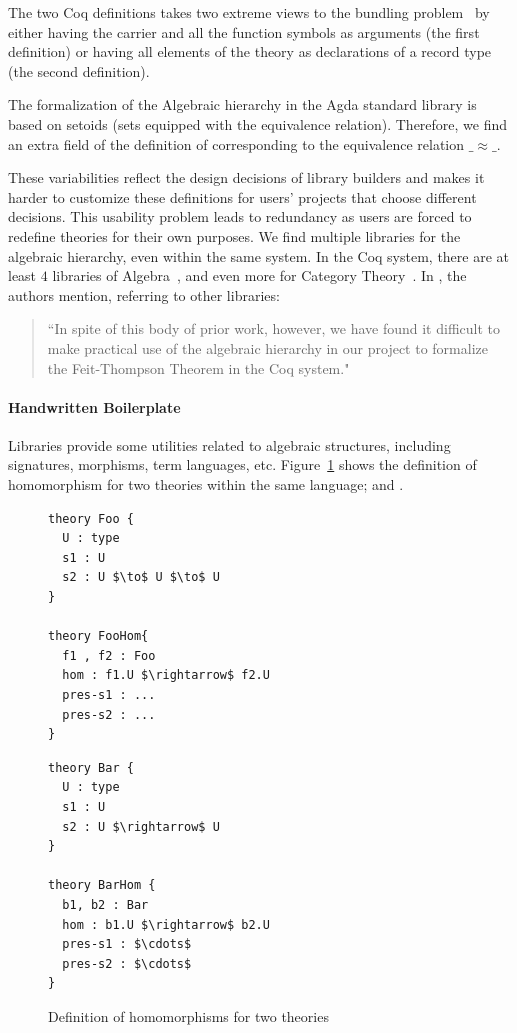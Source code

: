 The two Coq definitions takes two extreme views to the bundling problem~\cite{lean2019,alhassy2019,spitters2011type} by either having the carrier and all the function symbols as arguments (the first definition) or having all elements of the theory as declarations of a record type (the second definition). 

The formalization of the Algebraic hierarchy in the Agda standard library is based on setoids (sets equipped with the equivalence relation). Therefore, we find an extra field of the definition of \monoid corresponding to the equivalence relation $\_\approx\_$. 

These variabilities reflect the design decisions of library builders and makes it harder to customize these definitions for users' projects that choose different decisions. This usability problem leads to redundancy as users are forced to redefine theories for their own purposes. We find multiple libraries for the algebraic hierarchy, even within the same system. In the Coq system, there are at least $4$ libraries of Algebra~\cite{Gonthier2009,Geuvers2002,coq-contribs-algebra,Spitters2010}, and even more for Category Theory~\cite{spivak2014coqcats}. In 
\cite{Gonthier2009}, the authors
mention, referring to other libraries:  
\begin{quote}
    ``In spite of this body of prior work, however, we have found it
    difficult to make practical use of the algebraic hierarchy in our project to
    formalize the Feit-Thompson Theorem in the Coq system."
\end{quote}

\paragraph{Handwritten Boilerplate}
Libraries provide some utilities related to algebraic structures, including signatures, morphisms, term languages, etc. 
Figure~\ref{fig:hom-foo-bar} shows the definition of homomorphism for two theories within the same language;  and . 
\begin{figure}
\begin{multicols}{2}
  \begin{lstlisting}[mathescape]
theory Foo { 
  U : type 
  s1 : U 
  s2 : U $\to$ U $\to$ U
}

theory FooHom{
  f1 , f2 : Foo 
  hom : f1.U $\rightarrow$ f2.U 
  pres-s1 : ... 
  pres-s2 : ... 
}
\end{lstlisting}        
\columnbreak
\begin{lstlisting}[mathescape]
theory Bar {
  U : type 
  s1 : U 
  s2 : U $\rightarrow$ U 
}

theory BarHom { 
  b1, b2 : Bar 
  hom : b1.U $\rightarrow$ b2.U 
  pres-s1 : $\cdots$
  pres-s2 : $\cdots$
}
\end{lstlisting}
\end{multicols}    
\caption{Definition of homomorphisms for two theories}
\label{fig:hom-foo-bar}
\end{figure}

